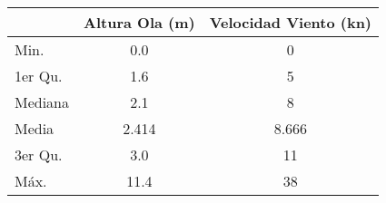 \begin{tabular}{lS[table-format=1.3]S[table-format=2.3]}
    \toprule
    & {Altura Ola (\si{\meter})} & {Velocidad Viento (\si{\knot})} \\
    \midrule
    Min.   & 0.0&  0   \\ 
    1er Qu.& 1.6   &  5   \\ 
    Mediana & 2.1   &  8   \\ 
    Media   & 2.414   &  8.666   \\ 
    3er Qu.& 3.0   & 11   \\ 
    Máx.   &11.4   & 38   \\ 
    \bottomrule
\end{tabular}
